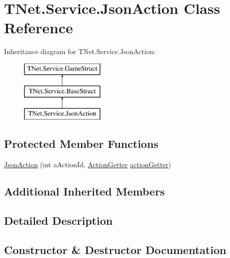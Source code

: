 \hypertarget{class_t_net_1_1_service_1_1_json_action}{}\section{T\+Net.\+Service.\+Json\+Action Class Reference}
\label{class_t_net_1_1_service_1_1_json_action}


 


Inheritance diagram for T\+Net.\+Service.\+Json\+Action\+:\begin{figure}[H]
\begin{center}
\leavevmode
\includegraphics[height=3.000000cm]{class_t_net_1_1_service_1_1_json_action}
\end{center}
\end{figure}
\subsection*{Protected Member Functions}
\begin{DoxyCompactItemize}
\item 
\mbox{\hyperlink{class_t_net_1_1_service_1_1_json_action_a5663f53b327d0ba2d0c5deff54ac7f04}{Json\+Action}} (int a\+Action\+Id, \mbox{\hyperlink{class_t_net_1_1_service_1_1_action_getter}{Action\+Getter}} \mbox{\hyperlink{class_t_net_1_1_service_1_1_game_struct_a14dcf224eb5a73e2c0b3bee4fe359dd8}{action\+Getter}})
\end{DoxyCompactItemize}
\subsection*{Additional Inherited Members}


\subsection{Detailed Description}




\subsection{Constructor \& Destructor Documentation}
\mbox{\label{class_t_net_1_1_service_1_1_json_action_a5663f53b327d0ba2d0c5deff54ac7f04}} 
